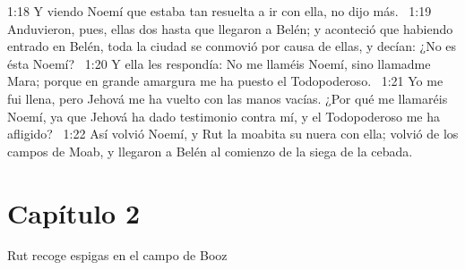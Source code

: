 1:18 Y viendo Noemí que estaba tan resuelta a ir con ella, no dijo más.  
1:19 Anduvieron, pues, ellas dos hasta que llegaron a Belén; y aconteció que habiendo entrado en Belén, toda la ciudad se conmovió por causa de ellas, y decían: ¿No es ésta Noemí?  
1:20 Y ella les respondía: No me llaméis Noemí, sino llamadme Mara; porque en grande amargura me ha puesto el Todopoderoso.  
1:21 Yo me fui llena, pero Jehová me ha vuelto con las manos vacías. ¿Por qué me llamaréis Noemí, ya que Jehová ha dado testimonio contra mí, y el Todopoderoso me ha afligido?  
1:22 Así volvió Noemí, y Rut la moabita su nuera con ella; volvió de los campos de Moab, y llegaron a Belén al comienzo de la siega de la cebada.  
\section*{Capítulo 2}
Rut recoge espigas en el campo de Booz  

